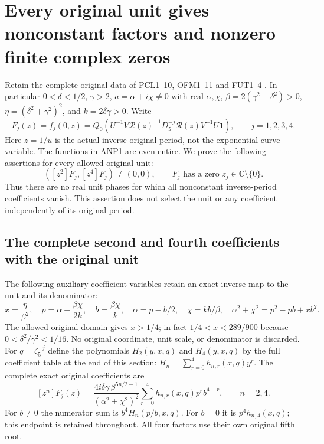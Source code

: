 \section{Every original unit gives nonconstant factors and nonzero finite complex zeros}
Retain the complete original data of PCL1--10, OFM1--11 and FUT1--4
\cite{PCLOriginal,NC,Cumulative,PeriodZeroOriginal}. In particular
$0<\delta<1/2$, $\gamma>2$, $a=\alpha+i\chi\ne0$ with real
$\alpha,\chi$, $\beta=2(\gamma^2-\delta^2)>0$,
$\eta=(\delta^2+\gamma^2)^2$, and $k=2\delta\gamma>0$.
Write
\[
 F_j(z)=f_j(0,z)
 =Q_0\!\left(U^{-1}V\mathcal R(z)^{-1}D_5^{-j}
                  \mathcal R(z)V^{-1}U\boldsymbol1\right),
 \qquad j=1,2,3,4.
 \tag{ANP1}
\]
Here $z=1/u$ is the actual inverse original period, not the
exponential-curve variable. The functions in ANP1 are even entire.
We prove the following assertions for every allowed original unit:
\[
 \boxed{\quad
 ([z^2]F_j,[z^4]F_j)\ne(0,0),\qquad
 F_j\text{ has a zero }z_j\in\mathbb C\setminus\{0\}.
 \quad}\tag{ANP2}
\]
Thus there are no real unit phases for which all nonconstant
inverse-period coefficients vanish. This assertion does not select
the unit or any coefficient independently of its original period.

\subsection{The complete second and fourth coefficients with the original unit}
The following auxiliary coefficient variables retain an exact inverse
map to the unit and its denominator:
\[
 x=\frac\eta{\beta^2},\quad
 p=\alpha+\frac{\beta\chi}{2k},\quad b=\frac{\beta\chi}{k},
 \quad
 \alpha=p-b/2,\quad\chi=kb/\beta,\quad
 \alpha^2+\chi^2=p^2-pb+xb^2.
 \tag{ANP3}
\]
The allowed original domain gives $x>1/4$; in fact
$1/4<x<289/900$ because $0<\delta^2/\gamma^2<1/16$.
No original coordinate, unit scale, or denominator is discarded.
For $q=\zeta_5^{-j}$ define the polynomials $H_2(y,x,q)$ and
$H_4(y,x,q)$ by the full coefficient table at the end of this section:
$H_n=\sum_{r=0}^4h_{n,r}(x,q)y^r$.
The complete exact original coefficients are
\[
 \boxed{\quad
 [z^n]F_j(z)=
 \frac{4i\delta\gamma\,\beta^{5n/2-1}}
      {(\alpha^2+\chi^2)^2}
       \sum_{r=0}^4h_{n,r}(x,q)p^rb^{4-r},
       \qquad n=2,4.
 \quad}\tag{ANP4}
\]
For $b\ne0$ the numerator sum is $b^4H_n(p/b,x,q)$.
For $b=0$ it is $p^4h_{n,4}(x,q)$; this endpoint is retained
throughout. All four factors use their own original fifth root.

